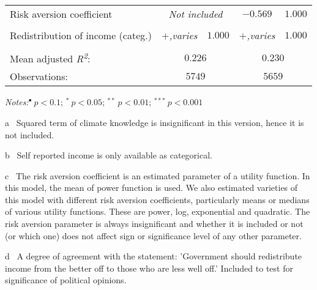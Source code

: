 \documentclass[a4paper,12pt]{article}
\begin{document}
{\begin{threeparttable}
\begin{small}
\begin{tabular}{lcccc}
  \\  \vspace{-0.33cm}Risk aversion coefficient\tnote{c}&\multicolumn{2}{c}{\textit{Not included}}&$-0.569$&$1.000$\\          
   \\
  \vspace{-0.35cm}Redistribution of income (categ.)\tnote{d}&\textit{$+$,varies}&$1.000$&\textit{$+$,varies}&$1.000$\\%
    \\
     \hline
          Mean adjusted \textit{R\textsuperscript2}:&\multicolumn{2}{c}{$0.226$}&\multicolumn{2}{c}{$0.230$}\\
  Observations: &\multicolumn{2}{c}{$5749$}&\multicolumn{2}{c}{$5659$}
\\
\hline
\end{tabular} 
\end{small}
 \begin{tablenotes}
  \begin{footnotesize}
 \item \textit{Notes:}\hspace{0.2cm}$^{\bullet}~p<0.1$; $^{*}~p<0.05$; $^{**}~p<0.01$; $^{***}~p<0.001$
 \begin{adjustwidth}{0.9cm}{}
  \vspace{-0.3cm}
 \item[a]~Squared term of climate knowledge is insignificant in this version, hence it is not included.
\item[b]~Self reported income is only available as categorical.
\item[c]~The risk aversion coefficient is an estimated parameter of a utility function. In this model, the mean of power function is used. We also estimated varieties of this model with different risk aversion coefficients, particularly means or medians of various utility functions. These are power, log, exponential and quadratic. The risk aversion parameter is always insignificant and whether it is included or not (or which one) does not affect sign or significance level of any other parameter. 
\item[d]~A degree of agreement with the statement: 'Government should redistribute income from the better off to those who are less well off.' Included to test for significance of political opinions.
     \end{adjustwidth}   
\singlespacing
  \end{footnotesize}
\end{tablenotes}
  \end{threeparttable} 
\par}

\vspace{0.2cm}
\end{document}
